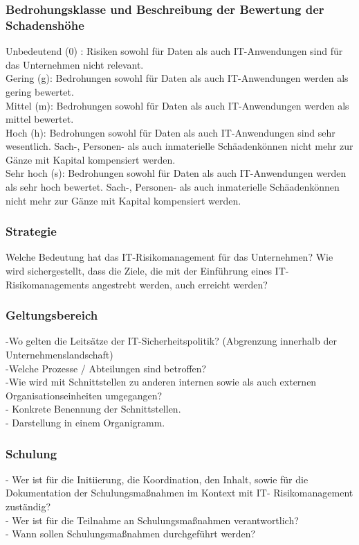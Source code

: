 \subsubsection {Bedrohungsklasse und Beschreibung der Bewertung der Schadenshöhe}
Unbedeutend (0) : Risiken sowohl für Daten als auch IT-Anwendungen sind für das Unternehmen nicht relevant.
\\Gering (g): Bedrohungen sowohl für Daten als auch IT-Anwendungen werden als gering bewertet.
\\Mittel (m): Bedrohungen sowohl für Daten als auch IT-Anwendungen werden als mittel bewertet.
\\Hoch (h): Bedrohungen sowohl für Daten als auch IT-Anwendungen sind sehr wesentlich. Sach-, Personen- als auch inmaterielle Schäadenkönnen nicht mehr zur Gänze mit Kapital kompensiert werden.
\\ Sehr hoch (s): Bedrohungen sowohl für Daten als auch IT-Anwendungen werden als sehr hoch bewertet. Sach-, Personen- als auch inmaterielle Schäadenkönnen nicht mehr zur Gänze mit Kapital kompensiert werden.
\subsubsection{Strategie}
Welche Bedeutung hat das IT-Risikomanagement für das Unternehmen? 
Wie wird sichergestellt, dass die Ziele, die mit der Einführung eines IT-Risikomanagements angestrebt werden, auch erreicht werden?
\subsubsection{Geltungsbereich}
-Wo gelten die Leitsätze der IT-Sicherheitspolitik? (Abgrenzung innerhalb der Unternehmenslandschaft)
\\-Welche Prozesse / Abteilungen sind betroffen?
\\-Wie wird mit Schnittstellen zu anderen internen sowie als auch externen Organisationseinheiten umgegangen?
\\- Konkrete Benennung der Schnittstellen.
\\- Darstellung in einem Organigramm.
\subsubsection{Schulung}
- Wer ist für die Initiierung, die Koordination, den Inhalt, sowie für die Dokumentation der Schulungsmaßnahmen im Kontext mit IT- Risikomanagement zuständig?
\\- Wer ist für die Teilnahme an Schulungsmaßnahmen verantwortlich?
\\- Wann sollen Schulungsmaßnahmen durchgeführt werden?
